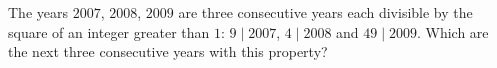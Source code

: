 The years $2007$, $2008$, $2009$ are three consecutive years each divisible by the square of an integer greater than $1$: $9\mid2007$, $4\mid2008$ and $49\mid2009$. Which are the next three consecutive years with this property?
